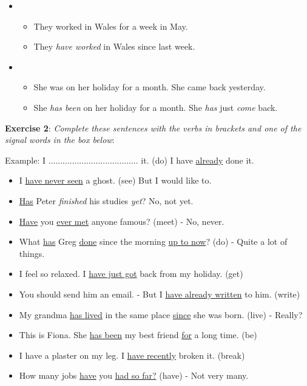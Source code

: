 \begin{itemize}
\item
\begin{itemize}
\item They worked in Wales for a week in May.
\item They \textit{have worked} in Wales since last week.
\end{itemize}

\item
\begin{itemize}
\item She was on her holiday for a month. She came back yesterday.
\item She \textit{has been} on her holiday for a month. She \textit{has} just \textit{come} back.
\end{itemize}

\end{itemize}

\textbf{Exercise 2}: \textit{Complete these sentences with the verbs in brackets and one of the signal words in the box below}:

Example:
I ...................................... it. (do)
I have \underline{already} done it.

\begin{itemize}

\item I \underline{have never seen} a ghost. (see) But I would like to.
\item \underline{Has} Peter \textit{finished} his studies \textit{yet}? No, not yet.
\item \underline{Have} you \underline{ever met} anyone famous? (meet) - No, never.
\item What \underline{has} Greg \underline{done} since the morning \underline{up to now}? (do) - Quite a lot of things.
\item I feel so relaxed. I \underline{have just got} back from my holiday. (get)
\item You should send him an email. - But I \underline{have already written} to him. (write)
\item My grandma \underline{has lived} in the same place \underline{since} she was born. (live) - Really?
\item This is Fiona. She \underline{has been} my best friend \underline{for} a long time. (be)
\item I have a plaster on my leg. I \underline{have recently} broken it. (break)
\item How many jobs \underline{have} you \underline{had so far?} (have) - Not very many.
\end{itemize}

